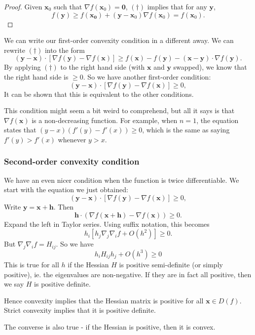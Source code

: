 \documentclass[a4paper]{article}
\begin{document}
\begin{proof}
  Given $\mathbf{x}_0$ such that $\nabla f(\mathbf{x}_0) = \mathbf{0}$, $(\dagger)$ implies that for any $\mathbf{y}$,
  \[
    f(\mathbf{y}) \geq f(\mathbf{x_0}) + (\mathbf{y} - \mathbf{x}_0)\nabla f(\mathbf{x}_0) = f(\mathbf{x}_0).
  \]
\end{proof}
We can write our first-order convexity condition in a different away. We can rewrite $(\dagger)$ into the form
\[
  (\mathbf{y} - \mathbf{x}) \cdot [\nabla f(\mathbf{y}) - \nabla f(\mathbf{x})] \geq f(\mathbf{x}) - f(\mathbf{y}) - (\mathbf{x} - \mathbf{y}) \cdot \nabla f(\mathbf{y}).
\]
By applying $(\dagger)$ to the right hand side (with $\mathbf{x}$ and $\mathbf{y}$ swapped), we know that the right hand side is $\geq 0$. So we have another first-order condition:
\[
  (\mathbf{y} - \mathbf{x})\cdot [\nabla f(\mathbf{y}) - \nabla f(\mathbf{x})]  \geq 0,
\]
It can be shown that this is equivalent to the other conditions.

This condition might seem a bit weird to comprehend, but all it says is that $\nabla f(\mathbf{x})$ is a non-decreasing function. For example, when $n = 1$, the equation states that $(y - x)(f'(y) - f'(x)) \geq 0$, which is the same as saying $f'(y) > f'(x)$ whenever $y > x$.

\subsubsection{Second-order convexity condition}
We have an even nicer condition when the function is twice differentiable. We start with the equation we just obtained:
\[
  (\mathbf{y} - \mathbf{x})\cdot [\nabla f(\mathbf{y}) - \nabla f(\mathbf{x})]  \geq 0,
\]
Write $\mathbf{y} = \mathbf{x} + \mathbf{h}$. Then
\[
  \mathbf{h} \cdot (\nabla f(\mathbf{x} + \mathbf{h}) - \nabla f(\mathbf{x})) \geq 0.
\]
Expand the left in Taylor series. Using suffix notation, this becomes
\[
  h_i [h_j \nabla_j \nabla_i f + O(h^2)] \geq 0.
\]
But $\nabla_j \nabla_i f = H_{ij}$. So we have
\[
  h_i H_{ij}h_j + O(h^3) \geq 0
\]
This is true for all $h$ if the Hessian $H$ is positive semi-definite (or simply positive), ie. the eigenvalues are non-negative. If they are in fact all positive, then we say $H$ is positive definite.

Hence convexity implies that the Hessian matrix is positive for all $\mathbf{x}\in D(f)$. Strict convexity implies that it is positive definite.

The converse is also true - if the Hessian is positive, then it is convex.
\end{document}
